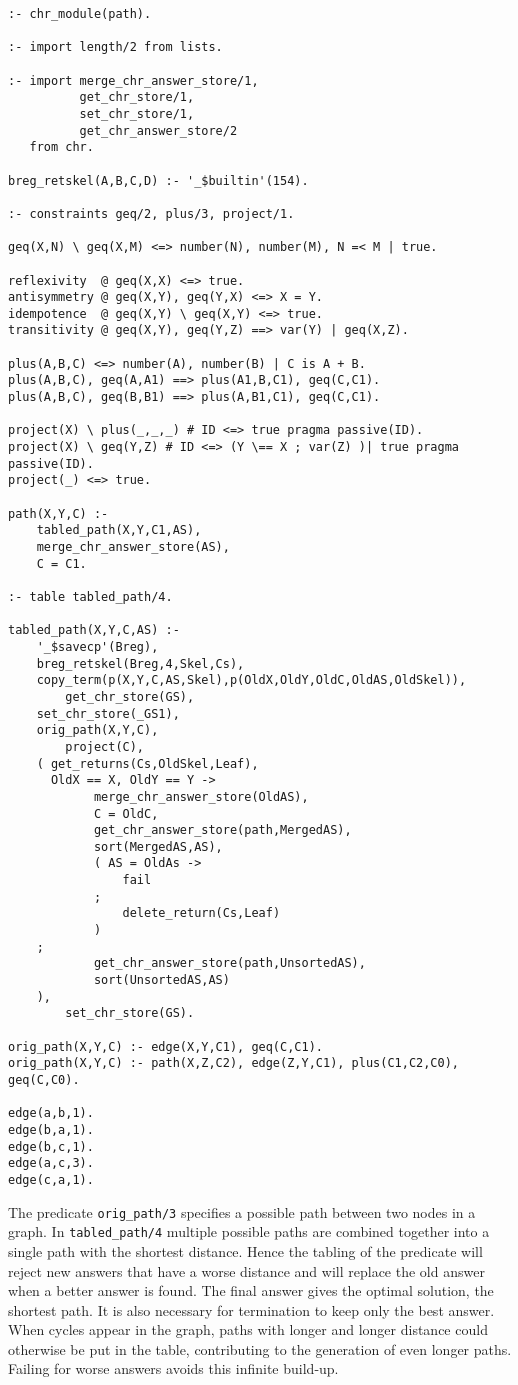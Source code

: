 \begin{small}
\begin{verbatim}
:- chr_module(path).

:- import length/2 from lists.

:- import merge_chr_answer_store/1, 
          get_chr_store/1,
          set_chr_store/1,
          get_chr_answer_store/2
   from chr.

breg_retskel(A,B,C,D) :- '_$builtin'(154).

:- constraints geq/2, plus/3, project/1.

geq(X,N) \ geq(X,M) <=> number(N), number(M), N =< M | true.

reflexivity  @ geq(X,X) <=> true.
antisymmetry @ geq(X,Y), geq(Y,X) <=> X = Y.
idempotence  @ geq(X,Y) \ geq(X,Y) <=> true.
transitivity @ geq(X,Y), geq(Y,Z) ==> var(Y) | geq(X,Z).

plus(A,B,C) <=> number(A), number(B) | C is A + B.
plus(A,B,C), geq(A,A1) ==> plus(A1,B,C1), geq(C,C1).
plus(A,B,C), geq(B,B1) ==> plus(A,B1,C1), geq(C,C1).

project(X) \ plus(_,_,_) # ID <=> true pragma passive(ID).
project(X) \ geq(Y,Z) # ID <=> (Y \== X ; var(Z) )| true pragma passive(ID).
project(_) <=> true.

path(X,Y,C) :-
	tabled_path(X,Y,C1,AS),
	merge_chr_answer_store(AS),
	C = C1.
	
:- table tabled_path/4.

tabled_path(X,Y,C,AS) :-
	'_$savecp'(Breg),
	breg_retskel(Breg,4,Skel,Cs),
	copy_term(p(X,Y,C,AS,Skel),p(OldX,OldY,OldC,OldAS,OldSkel)),
        get_chr_store(GS),
	set_chr_store(_GS1),
	orig_path(X,Y,C),
        project(C),
	( get_returns(Cs,OldSkel,Leaf),
	  OldX == X, OldY == Y ->
            merge_chr_answer_store(OldAS),
            C = OldC,
            get_chr_answer_store(path,MergedAS),
            sort(MergedAS,AS),
            ( AS = OldAs ->
                fail
            ;
                delete_return(Cs,Leaf)
            )
	;
            get_chr_answer_store(path,UnsortedAS),
            sort(UnsortedAS,AS)
	),
        set_chr_store(GS).

orig_path(X,Y,C) :- edge(X,Y,C1), geq(C,C1).
orig_path(X,Y,C) :- path(X,Z,C2), edge(Z,Y,C1), plus(C1,C2,C0), geq(C,C0).

edge(a,b,1).
edge(b,a,1).
edge(b,c,1).
edge(a,c,3).
edge(c,a,1).
\end{verbatim}
\end{small}

The predicate \texttt{orig\_path/3} specifies a possible path between two
nodes in a graph. In \texttt{tabled\_path/4} multiple possible paths are
combined together into a single path with the shortest distance.  Hence the
tabling of the predicate will reject new answers that have a worse distance
and will replace the old answer when a better answer is found. The final
answer gives the optimal solution, the shortest path. It is also necessary
for termination to keep only the best answer. When cycles appear in the graph,
 paths with longer and longer distance could otherwise be put in the table,
contributing to the generation of even longer paths. Failing for worse answers avoids
this infinite build-up.

